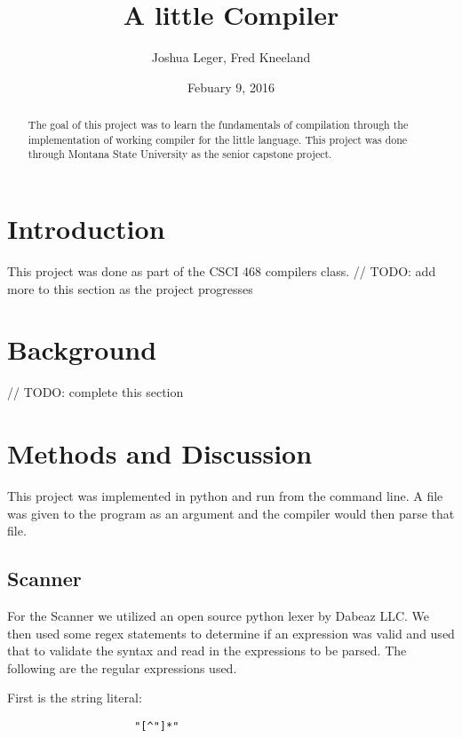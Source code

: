 \documentclass[12pt]{article}
\title{A little Compiler}
\author{Joshua Leger, Fred Kneeland}
\date{Febuary 9, 2016}
\begin{document}
    \maketitle
    \begin{abstract}
	
		The goal of this project was to learn the fundamentals of compilation through the implementation of working compiler for the little language.  This project was done through Montana State University as the senior capstone project.  	
	
    \end{abstract}
    \clearpage
    \tableofcontents
    \clearpage
    
    \section{Introduction}
		This project was done as part of the CSCI 468 compilers class.  // TODO: add more to this section as the project progresses 
		    
    \section{Background}
    		// TODO: complete this section
    	
    \section{Methods and Discussion}
    
    			This project was implemented in python and run from the command line.  A file was given to the program as an argument and the compiler would then parse that file.
    
    	\subsection{Scanner}
    			For the Scanner we utilized an open source python lexer by Dabeaz LLC.  We then used some regex statements to determine if an expression was valid and used that to validate the syntax and read in the expressions to be parsed. The following are the regular expressions used.

                First is the string literal:

                \begin{verbatim}
                    "[^"]*"
                \end{verbatim}
\end{document}
